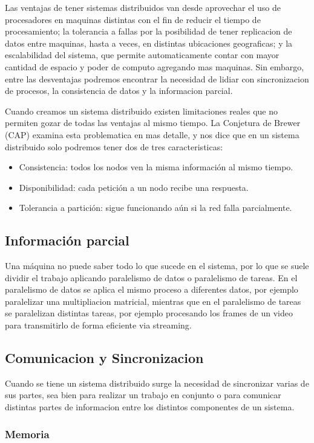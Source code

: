 \documentclass{article}
\begin{document}
Las ventajas de tener sistemas distribuidos van desde aprovechar el uso de procesadores en maquinas distintas con el fin de reducir el tiempo de procesamiento; la tolerancia a fallas por la posibilidad de tener replicacion de datos entre maquinas, hasta a veces, en distintas ubicaciones geograficas; y la escalabilidad del sistema, que permite automaticamente contar con mayor cantidad de espacio y poder de computo agregando mas maquinas. Sin embargo, entre las desventajas podremos encontrar la necesidad de lidiar con sincronizacion de procesos, la consistencia de datos y la informacion parcial.

Cuando creamos un sistema distribuido existen limitaciones reales que no permiten gozar de todas las ventajas al mismo tiempo. La Conjetura de Brewer (CAP) examina esta problematica en mas detalle, y nos dice que en un sistema distribuido solo podremos tener dos de tres caracteristicas:
\begin{itemize}
\item Consistencia: todos los nodos ven la misma información al mismo tiempo.
\item Disponibilidad: cada petición a un nodo recibe una respuesta.
\item Tolerancia a partición: sigue funcionando aún si la red falla parcialmente.
\end{itemize}

\subsection{Información parcial}
Una máquina no puede saber todo lo que sucede en el sistema, por lo que se suele dividir el trabajo aplicando paralelismo de datos o paralelismo de tareas. En el paralelismo de datos se aplica el mismo proceso a diferentes datos, por ejemplo paralelizar una multipliacion matricial, mientras que en el paralelismo de tareas se paralelizan distintas tareas, por ejemplo procesando los frames de un video para transmitirlo de forma eficiente via streaming.

\subsection{Comunicacion y Sincronizacion}
Cuando se tiene un sistema distribuido surge la necesidad de sincronizar varias de sus partes, sea bien para realizar un trabajo en conjunto o para comunicar distintas partes de informacion entre los distintos componentes de un sistema.

\subsubsection{Memoria}
\end{document}
